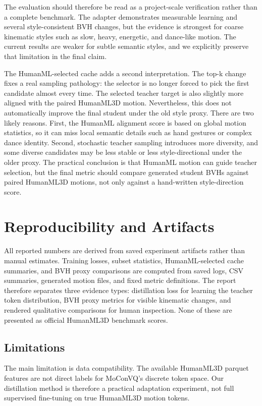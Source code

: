 \documentclass[conference]{IEEEtran}
\begin{document}
The evaluation should therefore be read as a project-scale verification rather than a complete benchmark. The adapter demonstrates measurable learning and several style-consistent BVH changes, but the evidence is strongest for coarse kinematic styles such as slow, heavy, energetic, and dance-like motion. The current results are weaker for subtle semantic styles, and we explicitly preserve that limitation in the final claim.

The HumanML-selected cache adds a second interpretation. The top-k change fixes a real sampling pathology: the selector is no longer forced to pick the first candidate almost every time. The selected teacher target is also slightly more aligned with the paired HumanML3D motion. Nevertheless, this does not automatically improve the final student under the old style proxy. There are two likely reasons. First, the HumanML alignment score is based on global motion statistics, so it can miss local semantic details such as hand gestures or complex dance identity. Second, stochastic teacher sampling introduces more diversity, and some diverse candidates may be less stable or less style-directional under the older proxy. The practical conclusion is that HumanML motion can guide teacher selection, but the final metric should compare generated student BVHs against paired HumanML3D motions, not only against a hand-written style-direction score.

\section{Reproducibility and Artifacts}
All reported numbers are derived from saved experiment artifacts rather than manual estimates. Training losses, subset statistics, HumanML-selected cache summaries, and BVH proxy comparisons are computed from saved logs, CSV summaries, generated motion files, and fixed metric definitions. The report therefore separates three evidence types: distillation loss for learning the teacher token distribution, BVH proxy metrics for visible kinematic changes, and rendered qualitative comparisons for human inspection. None of these are presented as official HumanML3D benchmark scores.

\subsection{Limitations}
The main limitation is data compatibility. The available HumanML3D parquet features are not direct labels for MoConVQ's discrete token space. Our distillation method is therefore a practical adaptation experiment, not full supervised fine-tuning on true HumanML3D motion tokens.
\end{document}
